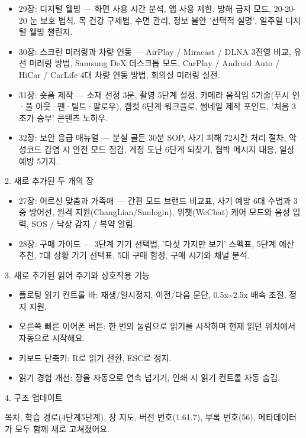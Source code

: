 \begin{itemize}
  \item 29장: 디지털 웰빙 — 화면 사용 시간 분석, 앱 사용 제한, 방해 금지 모드, 20-20-20 눈 보호 법칙, 목 건강 구제법, 수면 관리, 정보 불안 '선택적 실명', 일주일 디지털 웰빙 챌린지.
  \item 30장: 스크린 미러링과 차량 연동 — AirPlay / Miracast / DLNA 3진영 비교, 유선 미러링 방법, Samsung DeX 데스크톱 모드, CarPlay / Android Auto / HiCar / CarLife 4대 차량 연동 방법, 회의실 미러링 실전.
  \item 31장: 숏폼 제작 — 소재 선정 3문, 촬영 5단계 설정, 카메라 움직임 5기술(푸시 인·풀 아웃·팬·틸트·팔로우), 캡컷 6단계 워크플로, 썸네일 제작 포인트, '처음 3초가 승부' 콘텐츠 노하우.
  \item 32장: 보안 응급 매뉴얼 — 분실 골든 30분 SOP, 사기 피해 72시간 처리 절차, 악성코드 감염 시 안전 모드 점검, 계정 도난 6단계 되찾기, 협박 메시지 대응, 일상 예방 5가지.
\end{itemize}

2. 새로 추가된 두 개의 장

\begin{itemize}
  \item 27장: 어르신 맞춤과 가족애 — 간편 모드 브랜드 비교표, 사기 예방 6대 수법과 3중 방어선, 원격 지원(ChangLian/Sunlogin), 위챗(WeChat) 케어 모드와 음성 입력, SOS / 낙상 감지 / 복약 알림.
  \item 28장: 구매 가이드 — 3단계 기기 선택법, '다섯 가지만 보기' 스펙표, 5단계 예산 추천, 7대 상황 기기 선택표, 5대 구매 함정, 구매 시기와 채널 분석.
\end{itemize}

3. 새로 추가된 읽어 주기와 상호작용 기능

\begin{itemize}
  \item 플로팅 읽기 컨트롤 바: 재생/일시정지, 이전/다음 문단, 0.5x\textasciitilde{}2.5x 배속 조절, 정지 지원.
  \item 오른쪽 빠른 이어폰 버튼: 한 번의 눌림으로 읽기를 시작하며 현재 읽던 위치에서 자동으로 시작해요.
  \item 키보드 단축키: R로 읽기 전환, ESC로 정지.
  \item 읽기 경험 개선: 장을 자동으로 연속 넘기기, 인쇄 시 읽기 컨트롤 자동 숨김.
\end{itemize}

4. 구조 업데이트

목차, 학습 경로(4단계5단계), 장 지도, 버전 번호(1.61.7), 부록 번호(56), 메타데이터가 모두 함께 새로 고쳐졌어요.

